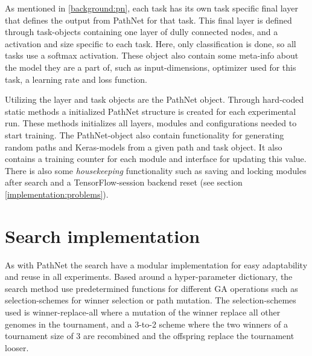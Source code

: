 As mentioned in \ref{background:pn}, each task has its own task specific final layer that defines the output from PathNet for that task. This final layer is defined through task-objects containing one layer of dully connected nodes, and a activation and size specific to each task. Here, only classification is done, so all tasks use a softmax activation. These object also contain some meta-info about the model they are a part of, such as input-dimensions, optimizer used for this task, a learning rate and loss function. 

Utilizing the layer and task objects are the PathNet object. Through hard-coded static methods a initialized PathNet structure is created for each experimental run. These methods initializes all layers, modules and configurations needed to start training. The PathNet-object also contain functionality for generating random paths and Keras-models from a given path and task object. It also contains a training counter for each module and interface for updating this value. There is also some \textit{housekeeping} functionality such as saving and locking modules after search and a TensorFlow-session backend reset (see section \ref{implementation:problems}).

\section{Search implementation}
\label{implementation.search}
As with PathNet the search have a modular implementation for easy adaptability and reuse in all experiments. Based around a hyper-parameter dictionary, the search method use predetermined functions for different GA operations such as selection-schemes for winner selection or path mutation. The selection-schemes used is winner-replace-all where a mutation of the winner replace all other genomes in the tournament, and a 3-to-2 scheme where the two winners of a tournament size of 3 are recombined and the offspring replace the tournament looser.

